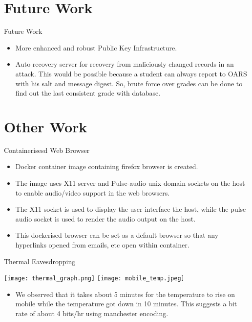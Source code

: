 \documentclass{beamer}
\begin{document}
\section{Future Work}
\begin{frame}{Future Work}
\begin{itemize}
\item More enhanced and robust Public Key Infrastructure.
\item Auto recovery server for recovery from maliciously changed records in an attack. This would be possible because a student can always report to OARS with his salt and message digest. So, brute force over grades can be done to find out the last consistent grade with database.
\end{itemize}
\end{frame}

\section{Other Work}
\begin{frame}{Containerisesd Web Browser}
\begin{itemize}
\item Docker container image containing firefox browser is created.
\item The image uses X11 server and Pulse-audio unix domain sockets on the host to enable audio/video support in the web browsers.
\item The X11 socket is used to display the user interface the host, while the pulse-audio socket is used to render the audio output on the host.
\item This dockerised browser can be set as a default browser so that any hyperlinks opened from emails, etc open within container.

\end{itemize}
\end{frame}

\begin{frame}{Thermal Eavesdropping}

\texttt{[image: thermal\_graph.png]}%
\texttt{[image: mobile\_temp.jpeg]}
\begin{itemize}
\item We observed that it takes about 5 minutes for the temperature to rise on mobile while the temperature got down in 10 minutes. This suggests a bit rate of about 4 bits/hr using manchester encoding.
\end{itemize}
\end{frame}
\end{document}
